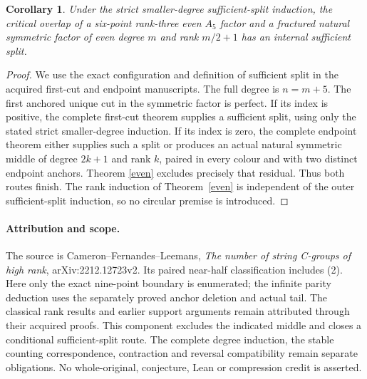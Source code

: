 \documentclass[11pt,a4paper]{article}
\newtheorem{corollary}[theorem]{Corollary}
\begin{document}
\begin{corollary}\label{critical}
Under the strict smaller-degree sufficient-split induction, the
critical overlap of a six-point rank-three even $A_5$ factor and
a fractured natural symmetric factor of even degree $m$ and rank
$m/2+1$ has an internal sufficient split.
\end{corollary}
\begin{proof}
We use the exact configuration and definition of sufficient split
in the acquired first-cut and endpoint manuscripts. The full
degree is $n=m+5$. The first anchored unique cut in the symmetric
factor is perfect. If its index is positive, the complete first-cut
theorem supplies a sufficient split, using only the stated strict
smaller-degree induction. If its index is zero, the complete
endpoint theorem either supplies such a split or produces an actual
natural symmetric middle of degree $2k+1$ and rank $k$, paired
in every colour and with two distinct endpoint anchors. Theorem
\ref{even} excludes precisely that residual. Thus both routes
finish. The rank induction of Theorem~\ref{even} is independent
of the outer sufficient-split induction, so no circular premise
is introduced.
\end{proof}

\paragraph{Attribution and scope.}
The source is Cameron--Fernandes--Leemans, \emph{The number of
string C-groups of high rank}, arXiv:2212.12723v2. Its paired
near-half classification includes (2). Here only the exact
nine-point boundary is enumerated; the infinite parity deduction
uses the separately proved anchor deletion and actual tail.
The classical rank results and earlier support arguments remain
attributed through their acquired proofs. This component excludes
the indicated middle and closes a conditional sufficient-split
route. The complete degree induction, the stable counting
correspondence, contraction and reversal compatibility remain
separate obligations. No whole-original, conjecture, Lean or
compression credit is asserted.
\end{document}
